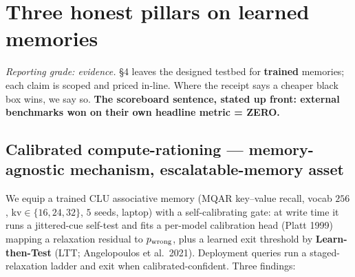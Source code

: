 \documentclass[11pt]{article}
\begin{document}
\section{Three honest pillars on learned memories}
\emph{Reporting grade: evidence.} \S4 leaves the designed testbed for \textbf{trained} memories; each claim is scoped and priced in-line. Where the receipt says a cheaper black box wins, we say so. \textbf{The scoreboard sentence, stated up front: external benchmarks won on their own headline metric = ZERO.}

\subsection{Calibrated compute-rationing --- memory-agnostic mechanism, escalatable-memory asset}
We equip a trained CLU associative memory (MQAR key--value recall, vocab $256$, kv$\in\{16,24,32\}$, $5$ seeds, laptop) with a self-calibrating gate: at write time it runs a jittered-cue self-test and fits a per-model calibration head (Platt 1999) mapping a relaxation residual to $p_{\rm wrong}$, plus a learned exit threshold by \textbf{Learn-then-Test} (LTT; Angelopoulos et al.\ 2021). Deployment queries run a staged-relaxation ladder and exit when calibrated-confident. Three findings:
\end{document}
